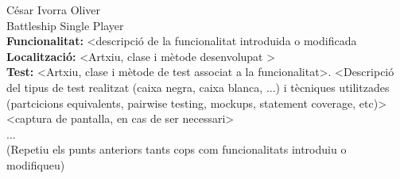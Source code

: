 \documentclass{article}
\begin{document}
	\noindent
	César Ivorra Oliver\\
	Battleship Single Player\\
	
	\noindent
	\textbf{Funcionalitat:} \textless descripció de la funcionalitat introduida o modificada \\
	
	\noindent
	\textbf{Localització:} \textless Artxiu, clase i mètode desenvolupat \textgreater \\
	
	\noindent
	\textbf{Test:} \textless Artxiu, clase i mètode de test associat a la funcionalitat\textgreater. \textless Descripció del tipus de test realitzat (caixa negra, caixa blanca, ...) i tècniques utilitzades (partcicions equivalents, pairwise testing, mockups, statement coverage, etc)\textgreater \\
	
	\noindent
	\textless captura de pantalla, en cas de ser necessari\textgreater  \\
	
	\noindent
	...\\
	
	\noindent
	(Repetiu els punts anteriors tants cops com funcionalitats introduiu o modifiqueu)
\end{document}
